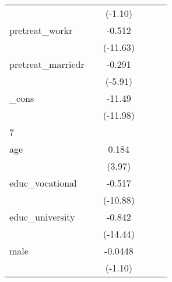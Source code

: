 {\begin{tabular}{l*{5}{c}}
            &                     &     (-1.10)         &                     &                     &                     \\
[1em]
pretreat\_workr&                     &      -0.512\sym{***}&                     &                     &                     \\
            &                     &    (-11.63)         &                     &                     &                     \\
[1em]
pretreat\_marriedr&                     &      -0.291\sym{***}&                     &                     &                     \\
            &                     &     (-5.91)         &                     &                     &                     \\
[1em]
\_cons      &                     &      -11.49\sym{***}&                     &                     &                     \\
            &                     &    (-11.98)         &                     &                     &                     \\
\hline
7           &                     &                     &                     &                     &                     \\
age         &                     &       0.184\sym{***}&                     &                     &                     \\
            &                     &      (3.97)         &                     &                     &                     \\
[1em]
educ\_vocational&                     &      -0.517\sym{***}&                     &                     &                     \\
            &                     &    (-10.88)         &                     &                     &                     \\
[1em]
educ\_university&                     &      -0.842\sym{***}&                     &                     &                     \\
            &                     &    (-14.44)         &                     &                     &                     \\
[1em]
male        &                     &     -0.0448         &                     &                     &                     \\
            &                     &     (-1.10)         &                     &                     &                     \\

\end{tabular}}
